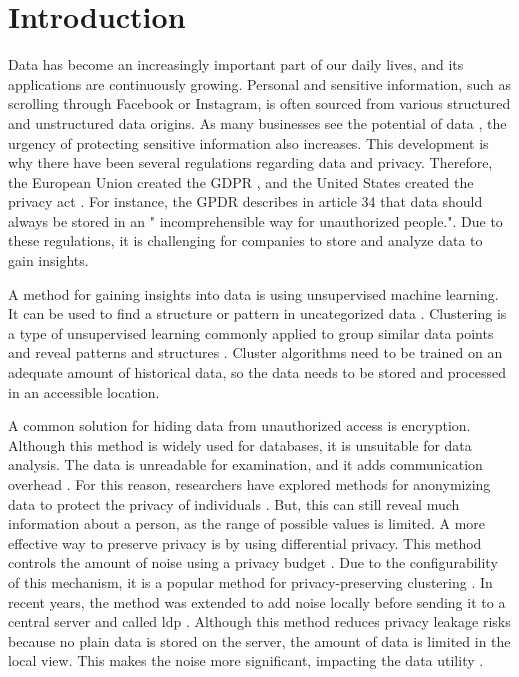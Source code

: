 \chapter{Introduction} \label{chapter:introduction}
Data has become an increasingly important part of our daily lives, and its applications are continuously growing.
Personal and sensitive information, such as scrolling through Facebook or Instagram, is often sourced from various structured and unstructured data origins.
As many businesses see the potential of data \citep{noauthor_global_nodate}, the urgency of protecting sensitive information also increases.
This development is why there have been several regulations regarding data and privacy. Therefore, the European Union created the GDPR \citep{noauthor_eur-lex_nodate}, and the United States created the privacy act \citep{division_privacy_2007}.
For instance, the GPDR describes in article 34 that data should always be stored in an " incomprehensible way for unauthorized people.".
Due to these regulations, it is challenging for companies to store and analyze data to gain insights.

A method for gaining insights into data is using unsupervised machine learning.
It can be used to find a structure or pattern in uncategorized data \citep{dridi_unsupervised_2021}.
Clustering is a type of unsupervised learning commonly applied to group similar data points and reveal patterns and structures \citep{dridi_unsupervised_2021}.
Cluster algorithms need to be trained on an adequate amount of historical data, so the data needs to be stored and processed in an accessible location.

A common solution for hiding data from unauthorized access is encryption.
Although this method is widely used for databases, it is unsuitable for data analysis.
The data is unreadable for examination, and it adds communication overhead \citep{liu_when_2022}.
For this reason, researchers have explored methods for anonymizing data to protect the privacy of individuals \citep{sweeney_k-anonymity_2002}.
But, this can still reveal much information about a person, as the range of possible values is limited.
A more effective way to preserve privacy is by using differential privacy.
This method controls the amount of noise using a privacy budget \citep{dwork_differential_2006}.
Due to the configurability of this mechanism, it is a popular method for privacy-preserving clustering .
In recent years, the method was extended to add noise locally before sending it to a central server and called \gls{ldp} \citep{kasiviswanathan_what_2010}.
Although this method reduces privacy leakage risks because no plain data is stored on the server, the amount of data is limited in the local view.
This makes the noise more significant, impacting the data utility \citep{yang_local_2020}.

